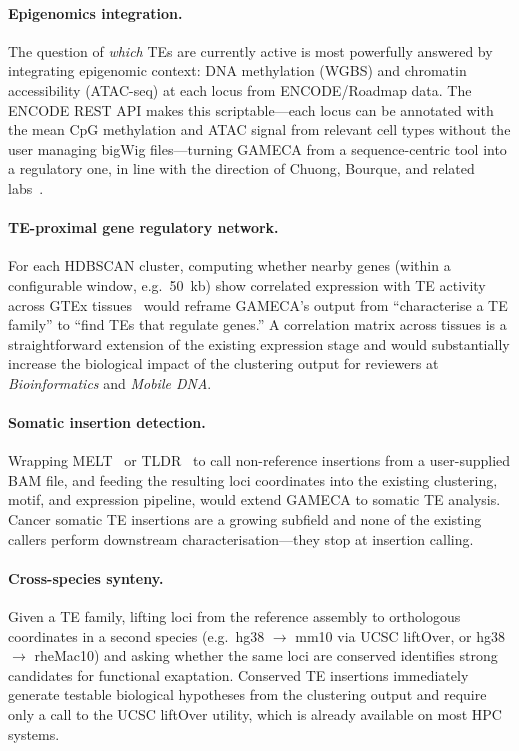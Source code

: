 \documentclass[11pt]{article}
\begin{document}
\paragraph{Epigenomics integration.}
The question of \emph{which} TEs are currently active is most powerfully answered by
integrating epigenomic context: DNA methylation (WGBS) and chromatin accessibility
(ATAC-seq) at each locus from ENCODE/Roadmap data.  The ENCODE REST API makes this
scriptable---each locus can be annotated with the mean CpG methylation and ATAC signal
from relevant cell types without the user managing bigWig files---turning GAMECA from a
sequence-centric tool into a regulatory one, in line with the direction of Chuong, Bourque,
and related labs~\citep{chuong2017enhancers,bourque2018}.

\paragraph{TE-proximal gene regulatory network.}
For each HDBSCAN cluster, computing whether nearby genes (within a configurable window,
e.g.\ 50~kb) show correlated expression with TE activity across GTEx tissues~\citep{gtex2020}
would reframe GAMECA's output from ``characterise a TE family'' to ``find TEs that regulate
genes.''  A correlation matrix across tissues is a straightforward extension of the existing
expression stage and would substantially increase the biological impact of the clustering
output for reviewers at \emph{Bioinformatics} and \emph{Mobile DNA}.

\paragraph{Somatic insertion detection.}
Wrapping MELT~\citep{gardner2017melt} or TLDR~\citep{ellrott2020tldr} to call
non-reference insertions from a user-supplied BAM file, and feeding the resulting loci
coordinates into the existing clustering, motif, and expression pipeline, would extend
GAMECA to somatic TE analysis.  Cancer somatic TE insertions are a growing subfield
and none of the existing callers perform downstream characterisation---they stop at insertion
calling.

\paragraph{Cross-species synteny.}
Given a TE family, lifting loci from the reference assembly to orthologous coordinates in
a second species (e.g.\ hg38 $\to$ mm10 via UCSC liftOver, or hg38 $\to$ rheMac10) and
asking whether the same loci are conserved identifies strong candidates for functional
exaptation.  Conserved TE insertions immediately generate testable biological hypotheses
from the clustering output and require only a call to the UCSC liftOver utility, which
is already available on most HPC systems.
\end{document}

